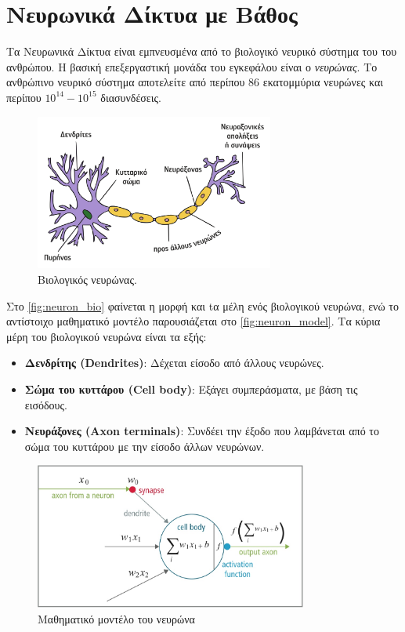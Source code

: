 \section{Νευρωνικά Δίκτυα με Βάθος}
\label{sec:theory_dnn}

Τα Νευρωνικά Δίκτυα είναι εμπνευσμένα από το βιολογικό νευρικό σύστημα του
του ανθρώπου. Η βασική επεξεργαστική μονάδα του εγκεφάλου είναι ο \emph{νευρώνας}.
Το ανθρώπινο νευρικό σύστημα αποτελείτε από περίπου 86 εκατομμύρια νευρώνες και περίπου
$10^14 - 10^15$ διασυνδέσεις.
\begin{figure}[!ht]
  \centering
  \includegraphics[width=0.7\textwidth]{./images/chapter3/neuron.png}
  \caption[Βιολογικός Νευρώνας]{Βιολογικός νευρώνας.}
  \label{fig:neuron_bio}
\end{figure}
Στο \autoref{fig:neuron_bio} φαίνεται η
μορφή και tα μέλη ενός βιολογικού νευρώνα, ενώ το αντίστοιχο μαθηματικό
μοντέλο παρουσιάζεται στο \autoref{fig:neuron_model}.
Τα κύρια μέρη του βιολογικού νευρώνα είναι τα εξής:
\begin{itemize}
  \item{\textbf{Δενδρίτης (Dendrites)}: Δέχεται είσοδο από άλλους νευρώνες.}
  \item{\textbf{Σώμα του κυττάρου (Cell body)}: Εξάγει συμπεράσματα, με βάση τις εισόδους.}
  \item{\textbf{Νευράξονες (Axon terminals)}: Συνδέει την έξοδο που λαμβάνεται από το σώμα του κυττάρου με την
    είσοδο άλλων νευρώνων.}
\end{itemize}

\begin{figure}[!ht]
  \centering
  \includegraphics[width=0.8\textwidth]{./images/chapter3/neuron_model.jpg}
  \caption[Μαθηματικό μοντέλο του νευρώνα]{Μαθηματικό μοντέλο του νευρώνα}
  \label{fig:neuron_model}
\end{figure}

